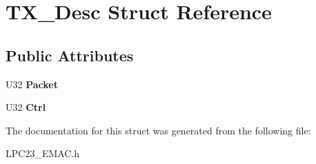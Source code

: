 \hypertarget{struct_t_x___desc}{
\section{TX\_\-Desc Struct Reference}
\label{struct_t_x___desc}
}
\subsection*{Public Attributes}
\begin{DoxyCompactItemize}
\item 
\hypertarget{struct_t_x___desc_a4ae641e5c88be1effc932cac18d3157e}{
U32 {\bfseries Packet}}
\label{struct_t_x___desc_a4ae641e5c88be1effc932cac18d3157e}

\item 
\hypertarget{struct_t_x___desc_a88b74477ac33db282d155d4d1314abea}{
U32 {\bfseries Ctrl}}
\label{struct_t_x___desc_a88b74477ac33db282d155d4d1314abea}

\end{DoxyCompactItemize}


The documentation for this struct was generated from the following file:\begin{DoxyCompactItemize}
\item 
LPC23\_\-EMAC.h\end{DoxyCompactItemize}
